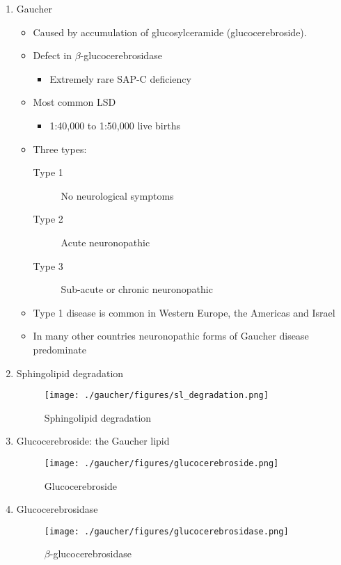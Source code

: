 \documentclass{scrartcl}
\begin{document}
\begin{enumerate}
\item Gaucher
\label{sec:org5977fdf}
\begin{itemize}
\item Caused by accumulation of glucosylceramide (glucocerebroside).
\item Defect in \(\beta\)-glucocerebrosidase
\begin{itemize}
\item Extremely rare SAP-C deficiency
\end{itemize}
\item Most common LSD
\begin{itemize}
\item 1:40,000 to 1:50,000 live births
\end{itemize}
\item Three types:
\begin{description}
\item[{Type 1}] No neurological symptoms
\item[{Type 2}] Acute neuronopathic
\item[{Type 3}] Sub-acute or chronic neuronopathic
\end{description}
\item Type 1 disease is common in Western Europe, the Americas and Israel
\item In many other countries neuronopathic forms of Gaucher disease predominate
\end{itemize}

\item Sphingolipid degradation
\label{sec:orgad6c7b5}

\begin{figure}[htbp]
\centering
\texttt{[image: ./gaucher/figures/sl\_degradation.png]}
\caption{\label{fig:orgcf7343d}
Sphingolipid degradation}
\end{figure}

\item Glucocerebroside: the Gaucher lipid
\label{sec:orged4e754}

\begin{figure}[htbp]
\centering
\texttt{[image: ./gaucher/figures/glucocerebroside.png]}
\caption{\label{fig:org2c02b23}
Glucocerebroside}
\end{figure}

\item Glucocerebrosidase
\label{sec:org39220af}


\begin{figure}[htbp]
\centering
\texttt{[image: ./gaucher/figures/glucocerebrosidase.png]}
\caption{\label{fig:orgbc346fd}
\(\beta\)-glucocerebrosidase}
\end{figure}


\end{enumerate}
\end{document}
